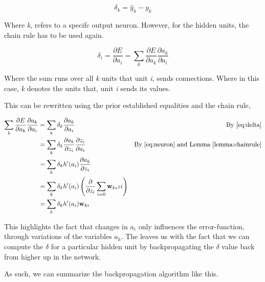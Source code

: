 \begin{equation}
\label{eq:output}
\delta_k = \hat{y}_k - y_k
\end{equation}

Where \textit{k}, refers to a specifc output neuron.
However, for the hidden units, the chain rule has to be used again.

\begin{equation}
\label{eq:bp}
\delta_i = \frac{\partial E}{\partial a_i} = 
\sum_k \frac{\partial E}{\partial a_k} \frac{\partial a_k}{\partial a_i}
\end{equation}

Where the sum runs over all \textit{k} units that unit \textit{i}, sends
connections. 
Where in this case, \textit{k} denotes the units that, unit \textit{i} sends
its values.

This can be rewritten using the prior established equalities and the chain rule,


\begin{align}
\sum_k \frac{\partial E}{\partial a_k} \frac{\partial a_k}{\partial a_i} &= 
\sum_k \delta_k \frac{\partial a_k}{\partial a_i} & \text{By \eqref{eq:delta}}\\
&= \sum_k \delta_k \frac{\partial a_k}{\partial z_i} \frac{\partial z_i}{\partial a_i} 
& \text{By \eqref{eq:neuron} and Lemma \ref{lemma:chainrule}} \\
&= \sum_k \delta_k h'(a_i) \frac{\partial a_k}{\partial z_i} \\
&= \sum_k \delta_k h'(a_i) \left( \frac{\partial}{\partial z_i}  \sum_{i=0} \mathbf{w}_{ki} z{i}\right) \\
&= \sum_k \delta_k h'(a_i) \mathbf{w}_{ki} \\
\end{align}

This highlights the fact that changes in $a_i$ only influences
the error-function, through variations of the variables $a_k$. The leaves us
with the fact that we can compute the $\delta$ for a particular hidden unit by
backpropagating the $\delta$ value back from higher up in the network.

As such, we can summarize the backpropagation algorithm like this.

